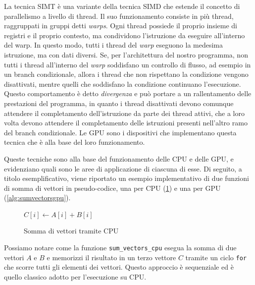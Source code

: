 La tecnica SIMT è una variante della tecnica SIMD che estende il concetto di parallelismo
a livello di thread. Il suo funzionamento consiste in più thread, raggruppati in
gruppi detti \textit{warps}. Ogni thread possiede il proprio insieme di registri
e il proprio contesto, ma condividono l'istruzione da eseguire all'interno del
warp. In questo modo, tutti i thread del \textit{warp} eseguono la medesima istruzione,
ma con dati diversi. Se, per l'architettura del nostro programma, non tutti i thread
all'interno del \textit{warp} soddisfano un controllo di flusso, ad esempio in un
branch condizionale, allora i thread che non rispettano la condizione vengono
disattivati, mentre quelli che soddisfano la condizione continuano l'esecuzione.
Questo comportamento è detto \textit{divergenza} e può portare a un rallentamento
delle prestazioni del programma, in quanto i thread disattivati devono comunque
attendere il completamento dell'istruzione da parte dei thread attivi, che a loro
volta devono attendere il completamento delle istruzioni presenti nell'altro ramo
del branch condizionale. Le GPU sono i dispositivi che implementano questa
tecnica che è alla base del loro funzionamento.

\vspace{1em}

Queste tecniche sono alla base del funzionamento delle CPU e delle GPU, e
evidenziano quali sono le aree di applicazione di ciascuna di esse. Di seguito,
a titolo esemplificativo, viene riportato un esempio implementativo di due funzioni
di somma di vettori in pseudo-codice, una per CPU (\ref{alg:sumvectorscpu}) e
una per GPU (\ref{alg:sumvectorsgpu}).

\begin{figure}[h!]
  \vspace{1em}
  \begin{algorithm}
    [H]
    \caption{Somma di vettori tramite CPU}
    \label{alg:sumvectorscpu}
    \begin{algorithmic}
        \State
      $C[i] \gets A[i] + B[i]$ \EndFor \EndFunction
    \end{algorithmic}
  \end{algorithm}
  \vspace{1em}
\end{figure}

Possiamo notare come la funzione \texttt{sum\_vectors\_cpu} esegua la somma di
due vettori $A$ e $B$ e memorizzi il risultato in un terzo vettore $C$ tramite
un ciclo \texttt{for} che scorre tutti gli elementi dei vettori. Questo
approccio è sequenziale ed è quello classico adotto per l'esecuzione su CPU.

